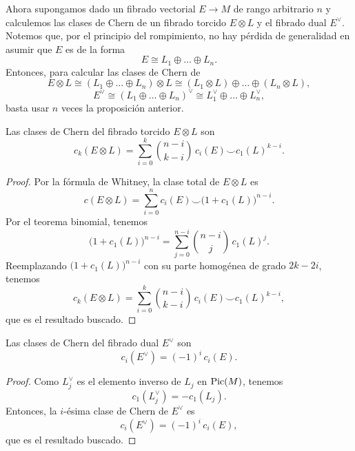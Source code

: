 Ahora supongamos dado un fibrado vectorial $E \to M$ de rango arbitrario $n$ y calculemos las clases de Chern de un fibrado torcido $E \otimes L$ y el fibrado dual $E^\vee$. Notemos que, por el principio del rompimiento, no hay pérdida de generalidad en asumir que $E$ es de la forma
$$E \cong L_1 \oplus \dots \oplus L_n.$$
Entonces, para calcular las clases de Chern de
$$
E \otimes L
    \cong (L_1 \oplus \dots \oplus L_n) \otimes L
    \cong (L_1 \otimes L) \oplus \dots \oplus (L_n \otimes L),
$$
$$
E^\vee
    \cong (L_1 \oplus \dots \oplus L_n)^\vee
    \cong L_1^\vee \oplus \dots \oplus L_n^\vee,
$$
basta usar $n$ veces la proposición anterior.

\begin{proposition}
Las clases de Chern del fibrado torcido $E \otimes L$ son
$$c_k(E \otimes L) = \sum_{i=0}^k \binom {n-i} {k-i} \, c_i(E) \smile c_1(L)^{k-i}.$$
\end{proposition}

\begin{proof}
Por la fórmula de Whitney, la clase total de $E \otimes L$ es
$$c(E \otimes L) = \sum_{i=0}^n c_i(E) \smile \big( 1 + c_1(L) \big)^{n-i}.$$
Por el teorema binomial, tenemos
$$\big( 1 + c_1(L) \big)^{n-i} = \sum_{j=0}^{n-i} \binom {n-i} j \, c_1(L)^j.$$
Reemplazando $\big( 1 + c_1(L) \big)^{n-i}$ con su parte homogénea de grado $2k - 2i$, tenemos
$$c_k(E \otimes L) = \sum_{i=0}^k \binom {n-i} {k-i} \, c_i(E) \smile c_1(L)^{k-i},$$
que es el resultado buscado.
\end{proof}

\begin{proposition}
Las clases de Chern del fibrado dual $E^\vee$ son
$$c_i(E^\vee) = (-1)^i \, c_i(E).$$
\end{proposition}

\begin{proof}
Como $L_j^\vee$ es el elemento inverso de $L_j$ en $\operatorname{Pic}(M)$, tenemos
$$c_1(L_j^\vee) = -c_1(L_j).$$
Entonces, la $i$-ésima clase de Chern de $E^\vee$ es
$$c_i(E^\vee) = (-1)^i \, c_i(E),$$
que es el resultado buscado.
\end{proof}
